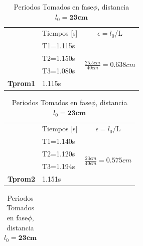 \documentclass{article}
\begin{document}
\begin{table}[H]
    \begin{subtable}{.5\linewidth}
      \centering 
        \begin{tabular}{@{}l|l|l|@{}}
\cmidrule(l){2-3}
\multicolumn{1}{c|}{} & \multicolumn{1}{c|}{Tiempos [s]} & \multicolumn{1}{c|}{$\epsilon=l_{0}$/L}     \\ \cmidrule(l){2-3} 
                      & T1=1.115s                        & \multirow{4}{*}{$\frac{25.5cm}{40cm}=0.638cm$} \\ \cmidrule(lr){2-2}
                      & T2=1.150s                        &                                \\ \cmidrule(lr){2-2}
                      & T3=1.080s                        &                                \\ \cmidrule(lr){2-2}
\textbf{Tprom1}   & 1.115s                            &                                \\ \cmidrule(l){2-3} 
\end{tabular}
\caption{Periodos Tomados en fase$\phi$, distancia $l_{0}=25.5cm$}
\label{fase1}
    \end{subtable}%
    \begin{subtable}{.8\linewidth}
      \centering
        \begin{tabular}{@{}l|l|l|@{}}
		\cmidrule(l){2-3}
\multicolumn{1}{c|}{} & \multicolumn{1}{c|}{Tiempos [s]} & \multicolumn{1}{c|}{$\epsilon=l_{0}$/L}       \\ \cmidrule(l){2-3} 
                      & T1=1.140s                        & \multirow{4}{*}{$\frac{23cm}{40cm}=0.575cm$}  \\ \cmidrule(lr){2-2}
                      & T2=1.120s                        &                                                 \\ \cmidrule(lr){2-2}
                      & T3=1.194s                        &                                  				 \\ \cmidrule(lr){2-2}
	\textbf{Tprom2}   & 1.151s                           &               				                      \\ \cmidrule(l){2-3} 
\end{tabular}
\caption{Periodos Tomados en fase$\phi$, distancia $l_{0}=\textbf{23cm}$}
\label{fase1-2}
    \end{subtable}     
    \begin{subtable}{.5\linewidth}
      \centering
        \begin{tabular}{@{}l|l|l|@{}}

\end{tabular}
\end{subtable}
\end{table}
\end{document}
